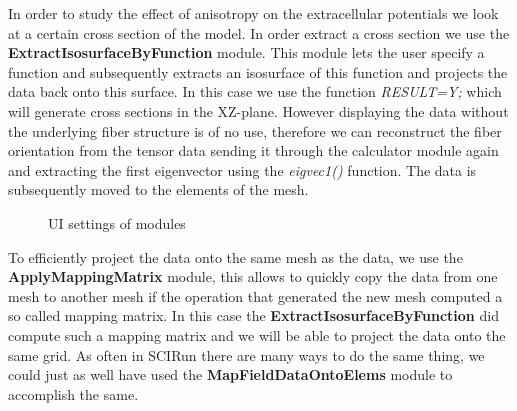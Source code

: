 \documentclass[fleqn,11pt,openany]{book}
\begin{document}
In order to study the effect of anisotropy on the extracellular potentials we look at a certain cross section of the model. In order extract a cross section we use the {\bf ExtractIsosurfaceByFunction} module. This module lets the user specify a function and subsequently extracts an isosurface of this function and projects the data back
onto this surface. In this case we use the function {\em RESULT=Y;} which will generate cross sections in the XZ-plane. However displaying the data without the underlying
fiber structure is of no use, therefore we can reconstruct the fiber orientation from the tensor data sending it through the calculator module again and extracting the first eigenvector using the {\it eigvec1()} function. The data is subsequently moved to the elements of the mesh.
\begin{figure}
\caption{UI settings of modules}\label{fig:SimulationNetwork4}
\end{figure}

To efficiently project the data onto the same mesh as the data, we use the {\bf ApplyMappingMatrix} module, this allows to quickly copy the data from one mesh to another mesh if the operation that generated the new mesh computed a so called mapping matrix. In this case the {\bf ExtractIsosurfaceByFunction} did compute such a mapping matrix and we will be able to project the data onto the same grid. As often in SCIRun there are many ways to do the same thing, we could just as well have used the {\bf MapFieldDataOntoElems} module to accomplish the same. 
\end{document}
